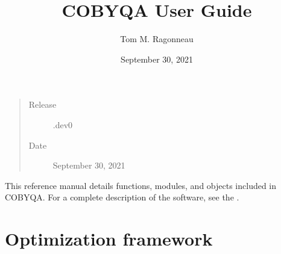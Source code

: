 \documentclass[letterpaper,10pt,english]{sphinxmanual}
\title{COBYQA User Guide}
\date{September 30, 2021}
\author{Tom M. Ragonneau}
\begin{document}
\pagestyle{empty}
\sphinxmaketitle
\pagestyle{plain}
\sphinxtableofcontents
\pagestyle{normal}
\label{\detokenize{refs/index::doc}}

\begin{quote}\begin{description}
\item[{Release}] \leavevmode
{}.dev0

\item[{Date}] \leavevmode
\sphinxAtStartPar
September 30, 2021

\end{description}\end{quote}

\sphinxAtStartPar
This reference manual details functions, modules, and objects included in
COBYQA. For a complete description of the software, see the
.


\chapter{Optimization framework}
\label{\detokenize{refs/optimize:optimization-framework}}\label{\detokenize{refs/optimize::doc}}
\end{document}
